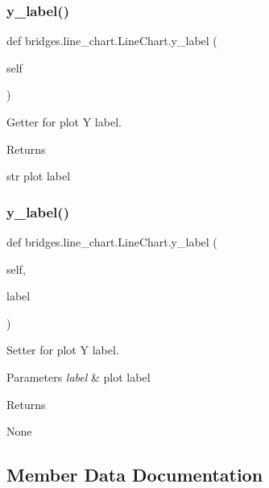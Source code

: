 \subsubsection{\texorpdfstring{y\+\_\+label()}{y\_label()}\hspace{0.1cm}{\footnotesize\ttfamily [1/2]}}
{\footnotesize\ttfamily def bridges.\+line\+\_\+chart.\+Line\+Chart.\+y\+\_\+label (\begin{DoxyParamCaption}\item[{}]{self }\end{DoxyParamCaption})}



Getter for plot Y label. 

\begin{DoxyReturn}{Returns}


str plot label 
\end{DoxyReturn}
\mbox{\label{classbridges_1_1line__chart_1_1_line_chart_a13a80664727dc3302e7f7d4b29b58833}} 
\subsubsection{\texorpdfstring{y\+\_\+label()}{y\_label()}\hspace{0.1cm}{\footnotesize\ttfamily [2/2]}}
{\footnotesize\ttfamily def bridges.\+line\+\_\+chart.\+Line\+Chart.\+y\+\_\+label (\begin{DoxyParamCaption}\item[{}]{self,  }\item[{}]{label }\end{DoxyParamCaption})}



Setter for plot Y label. 


\begin{DoxyParams}{Parameters}
{\em label} & plot label \\
\hline
\end{DoxyParams}
\begin{DoxyReturn}{Returns}


None 
\end{DoxyReturn}


\subsection{Member Data Documentation}
\mbox{\label{classbridges_1_1line__chart_1_1_line_chart_a13a52ecfbe82477fd6203aaa7569c1c7}} 
